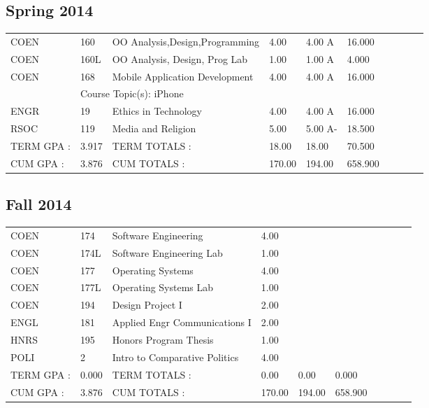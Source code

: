\documentclass{scrartcl}\usepackage[T1]{fontenc}
\begin{document}
\subsection{Spring 2014}
\begin{tabular}{ l  l  l  l  l  l  l  l  l  l }
COEN&160&OO Analysis,Design,Programming&4.00&4.00 A&16.000& & & & \\
COEN&160L&OO Analysis, Design, Prog Lab&1.00&1.00 A&4.000& & & & \\
COEN&168&Mobile Application Development&4.00&4.00 A&16.000& & & & \\
\multicolumn{1}{l}{ }
&
\multicolumn{9}{l}{Course Topic(s): iPhone}
\\
ENGR&19&Ethics in Technology&4.00&4.00 A&16.000& & & & \\
RSOC&119&Media and Religion&5.00&5.00 A-&18.500& & & & \\
\hline
TERM GPA :&3.917&TERM TOTALS :&18.00&18.00&70.500& & & & \\
CUM GPA :&3.876&CUM TOTALS :&170.00&194.00&658.900& & & & \\\end{tabular}
\subsection{Fall 2014}
\begin{tabular}{ l  l  l  l  l  l  l  l  l  l }
COEN&174&Software Engineering&4.00& & & & & & \\
COEN&174L&Software Engineering Lab&1.00& & & & & & \\
COEN&177&Operating Systems&4.00& & & & & & \\
COEN&177L&Operating Systems Lab&1.00& & & & & & \\
COEN&194&Design Project I&2.00& & & & & & \\
ENGL&181&Applied Engr Communications I&2.00& & & & & & \\
HNRS&195&Honors Program Thesis&1.00& & & & & & \\
POLI&2&Intro to Comparative Politics&4.00& & & & & & \\
\hline
TERM GPA :&0.000&TERM TOTALS :&0.00&0.00&0.000& & & & \\
CUM GPA :&3.876&CUM TOTALS :&170.00&194.00&658.900& & & & \\\end{tabular}
\end{document}
